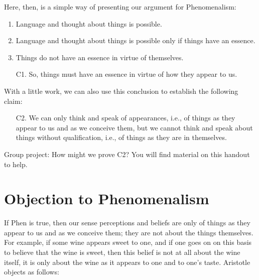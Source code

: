 \documentclass[article,oneside]{memoir}
\begin{document}
Here, then, is a simple way of presenting our argument for Phenomenalism: 

\begin{enumerate}
\item Language and thought about things is possible. 
\item Language and thought about things is possible only if things have an essence. 
\item Things do not have an essence in virtue of themselves. 
\item[C1.] So, things must have an essence in virtue of how they appear to us. 
\end{enumerate}
With a little work, we can also use this conclusion to establish the following claim: 

\begin{itemize}
\item[C2.] We can only think and speak of appearances, i.e., of things as they appear to us and as we conceive them, but we cannot think and speak about things without qualification, i.e., of things as they are in themselves. 
\end{itemize}

\noindent Group project: How might we prove C2? You will find material on this handout to help. 




\section{Objection to Phenomenalism}

If Phen is true, then our sense perceptions and beliefs are only of things as they appear to us and as we conceive them; they are not about the things themselves. For example, if some wine appears sweet to one, and if one goes on on this basis to believe that the wine is sweet, then this belief is not at all about the wine itself, it is only about the wine as it appears to one and to one’s taste. Aristotle objects as follows: 
\end{document}
